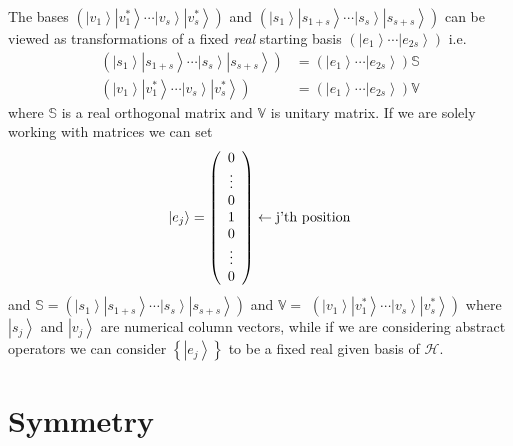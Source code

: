 \documentclass[aps,preprint]{revtex4}%
\begin{document}
The bases $\left(  \left\vert v_{1}\right\rangle \left\vert v_{1}^{\ast
}\right\rangle \cdots\left\vert v_{s}\right\rangle \left\vert v_{s}^{\ast
}\right\rangle \right)  $ and $\left(  \left\vert s_{1}\right\rangle
\left\vert s_{1+s}\right\rangle \cdots\left\vert s_{s}\right\rangle \left\vert
s_{s+s}\right\rangle \right)  $ can be viewed as transformations of a fixed
\emph{real }starting basis $\left(  \left\vert e_{1}\right\rangle
\cdots\left\vert e_{2s}\right\rangle \right)  $ i.e.%
\begin{align}
\left(  \left\vert s_{1}\right\rangle \left\vert s_{1+s}\right\rangle
\cdots\left\vert s_{s}\right\rangle \left\vert s_{s+s}\right\rangle \right)
& =\left(  \left\vert e_{1}\right\rangle \cdots\left\vert e_{2s}\right\rangle
\right)  \mathbb{S}\nonumber\\
\left(  \left\vert v_{1}\right\rangle \left\vert v_{1}^{\ast}\right\rangle
\cdots\left\vert v_{s}\right\rangle \left\vert v_{s}^{\ast}\right\rangle
\right)   & =\left(  \left\vert e_{1}\right\rangle \cdots\left\vert
e_{2s}\right\rangle \right)  \mathbb{V}%
\end{align}
where $\mathbb{S}$ is a real orthogonal matrix and $\mathbb{V}$ is unitary
matrix. If we are solely working with matrices we can set
\begin{equation}
\left\vert e_{j}\right\rangle =\left(
\begin{array}
[c]{c}%
0\\
\vdots\\
0\\
1\\
0\\
\vdots\\
0
\end{array}
\right)  \leftarrow\text{j'th position}%
\end{equation}
and $\mathbb{S}=\left(  \left\vert s_{1}\right\rangle \left\vert
s_{1+s}\right\rangle \cdots\left\vert s_{s}\right\rangle \left\vert
s_{s+s}\right\rangle \right)  $ and $\mathbb{V}=$ $\left(  \left\vert
v_{1}\right\rangle \left\vert v_{1}^{\ast}\right\rangle \cdots\left\vert
v_{s}\right\rangle \left\vert v_{s}^{\ast}\right\rangle \right)  $ where
$\left\vert s_{j}\right\rangle $ and $\left\vert v_{j}\right\rangle $ are
numerical column vectors, while if we are considering abstract operators we
can consider $\left\{  \left\vert e_{j}\right\rangle \right\}  $ to be a fixed
real given basis of $\mathcal{H}$.

\section{Symmetry}
\end{document}
